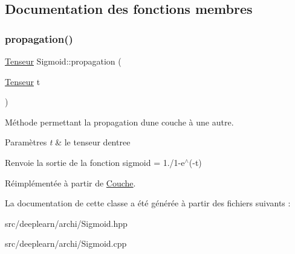 \subsection{Documentation des fonctions membres}
\mbox{\label{classSigmoid_a6bd1f6bbc49bd7e634dc33701aee420c}} 
\subsubsection{\texorpdfstring{propagation()}{propagation()}}
{\footnotesize\ttfamily \hyperlink{classTenseur}{Tenseur} Sigmoid\+::propagation (\begin{DoxyParamCaption}\item[{\hyperlink{classTenseur}{Tenseur}}]{t }\end{DoxyParamCaption})\hspace{0.3cm}{\ttfamily [virtual]}}



Méthode permettant la propagation d\textquotesingle{}une couche à une autre. 


\begin{DoxyParams}{Paramètres}
{\em t} & le tenseur d\textquotesingle{}entree \\
\hline
\end{DoxyParams}
\begin{DoxyReturn}{Renvoie}
la sortie de la fonction sigmoid = 1./1-\/e$^\wedge$(-\/t) 
\end{DoxyReturn}


Réimplémentée à partir de \hyperlink{classCouche_a1f0ed59e21020f5d4f37933af4d1b1e5}{Couche}.



La documentation de cette classe a été générée à partir des fichiers suivants \+:\begin{DoxyCompactItemize}
\item 
src/deeplearn/archi/Sigmoid.\+hpp\item 
src/deeplearn/archi/Sigmoid.\+cpp\end{DoxyCompactItemize}
